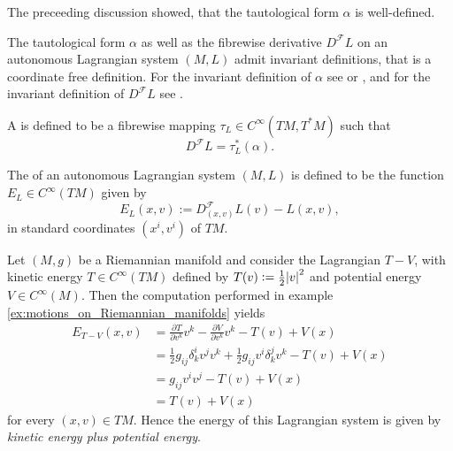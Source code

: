 \begin{remark}
	The preceeding discussion showed, that the tautological form $\alpha$ is well-defined.
\end{remark}

\begin{remark}
	The tautological form $\alpha$ as well as the fibrewise derivative $D^\mathcal{F}L$ on an autonomous Lagrangian system $(M,L)$ admit invariant definitions, that is a coordinate free definition. For the invariant definition of $\alpha$ see \cite[569]{lee:smooth_manifolds:2013} or \cite[10--11]{silva:SG:2008}, and for the invariant definition of $D^\mathcal{F}L$ see \cite[31]{takhtajan:QM:2008}. 
\end{remark}

\begin{definition}
	A  is defined to be a fibrewise mapping $\tau_L \in C^\infty(TM,T^*M)$ such that
	\begin{equation*}
		D^\mathcal{F}L = \tau_L^*(\alpha).
	\end{equation*}
\end{definition}

\begin{definition}[Energy]
	The  of an autonomous Lagrangian system $(M,L)$ is defined to be the function $E_L \in C^\infty(TM)$ given by
	\begin{equation*}
		E_L(x,v) := D^\mathcal{F}_{(x,v)}L(v) - L(x,v),
	\end{equation*}
	\noindent in standard coordinates $(x^i,v^i)$ of $TM$.
\end{definition}

\begin{example}
	Let $(M,g)$ be a Riemannian manifold and consider the Lagrangian $T - V$, with kinetic energy $T \in C^\infty(TM)$ defined by $T(v) := \frac{1}{2}\abs{v}^2$ and potential energy $V \in C^\infty(M)$. Then the computation performed in example \ref{ex:motions_on_Riemannian_manifolds} yields
	\begin{align*}
		E_{T - V}(x,v) &= \frac{\partial T}{\partial v^k}v^k - \frac{\partial V}{\partial v^k}v^k - T(v) + V(x)\\
		&= \frac{1}{2}g_{ij}\delta^i_k v^jv^k + \frac{1}{2}g_{ij}v^i \delta^j_k v^k - T(v) + V(x)\\
		&= g_{ij}v^i v^j - T(v) + V(x)\\
		&= T(v) + V(x)
	\end{align*}
	\noindent for every $(x,v) \in TM$. Hence the energy of this Lagrangian system is given by \emph{kinetic energy plus potential energy}.
\end{example}

